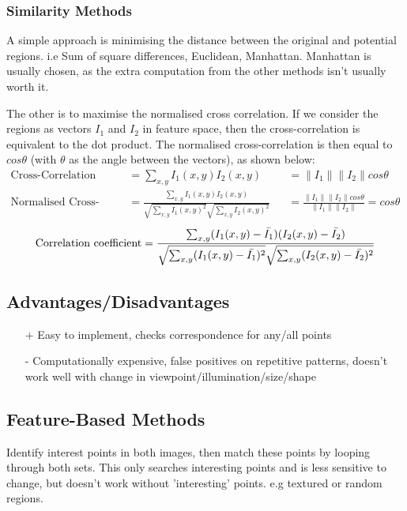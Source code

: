 \subsubsection{Similarity Methods} \label{similarity_methods}
A simple approach is minimising the distance between the original and potential regions. i.e Sum of square differences, Euclidean, Manhattan. Manhattan is usually chosen, as the extra computation from the other methods isn't usually worth it.

The other is to maximise the normalised cross correlation. If we consider the regions as vectors $I_1$ and $I_2$ in feature space, then the cross-correlation is equivalent to the dot product. The normalised cross-correlation is then equal to $cos\theta$ (with $\theta$ as the angle between the vectors), as shown below:
\begin{align}
    \text{Cross-Correlation} &= \sum_{x,y}I_1(x,y)I_2(x,y) &&= \|I_1\|\|I_2\|cos\theta \\
    \text{Normalised Cross-Correlation} &= \frac{\sum_{x,y}I_1(x,y)I_2(x,y)}{\sqrt{\sum_{x,y}I_1(x,y)^2}\sqrt{\sum_{x,y}I_2(x,y)^2}} &&= \frac{\|I_1\|\|I_2\|cos\theta}{\|I_1\|\|I_2\|} = cos\theta 
\end{align}
\begin{equation}
    \text{Correlation coefficient} = \frac{\sum_{x,y}(I_1(x,y) - \Bar{I_1})(I_2(x,y) - \Bar{I_2})}{\sqrt{\sum_{x,y}(I_1(x,y)- \Bar{I_1})^2}\sqrt{\sum_{x,y}(I_2(x,y)- \Bar{I_2})^2}}  
\end{equation}

\subsection{Advantages/Disadvantages}
\begin{enumerate}
    \item [+] Easy to implement, checks correspondence for any/all points
    \item [-] Computationally expensive, false positives on repetitive patterns, doesn't work well with change in viewpoint/illumination/size/shape
\end{enumerate}

\subsection{Feature-Based Methods}
Identify interest points in both images, then match these points by looping through both sets. This only searches interesting points and is less sensitive to change, but doesn't work without 'interesting' points. e.g textured or random regions.

